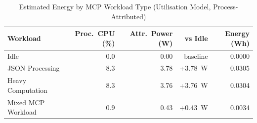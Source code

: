 
\begin{table}[h]
\centering
\caption{Estimated Energy by MCP Workload Type (Utilisation Model, Process-Attributed)}
\label{tab:energy_benchmark}
\begin{tabular}{lrrrr}
\toprule
\textbf{Workload} & \textbf{Proc.\ CPU (\%)} & \textbf{Attr.\ Power (W)} & \textbf{vs Idle} & \textbf{Energy (Wh)} \\
\midrule
Idle & 0.0 & 0.00 & baseline & 0.0000 \\
JSON Processing & 8.3 & 3.78 & +3.78~W & 0.0305 \\
Heavy Computation & 8.3 & 3.76 & +3.76~W & 0.0304 \\
Mixed MCP Workload & 0.9 & 0.43 & +0.43~W & 0.0034 \\
\bottomrule
\end{tabular}
\end{table}
